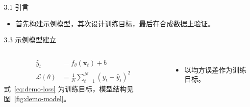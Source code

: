 \documentclass[aspectratio=169,11pt]{ctexbeamer}
\begin{document}
\begin{frame}[plain]
\end{frame}

\begin{frame}{3.1 引言}
\begin{itemize}
  \item 首先构建示例模型，其次设计训练目标，最后在合成数据上验证。
\end{itemize}
\end{frame}

\begin{frame}{3.3 示例模型建立}
\begin{columns}[T,onlytextwidth]
  \begin{DefenseSource}
  \begin{align*}
    \hat{y}_t &= f_{\theta}(\mathbf{x}_t) + b \tag*{(3-1)}\\
    \mathcal{L}(\theta) &= \frac{1}{N}\sum_{t=1}^{N}\left(y_t-\hat{y}_t\right)^2 \tag*{(3-2)}
  \end{align*}
  式~\eqref{eq:demo-loss} 为训练目标，模型结构见图~\ref{fig:demo-model}\cite{demo-ref}。
  \end{DefenseSource}
  \begin{itemize}
    \item 以均方误差作为训练目标。
  \end{itemize}
\end{columns}
\end{frame}
\end{document}
